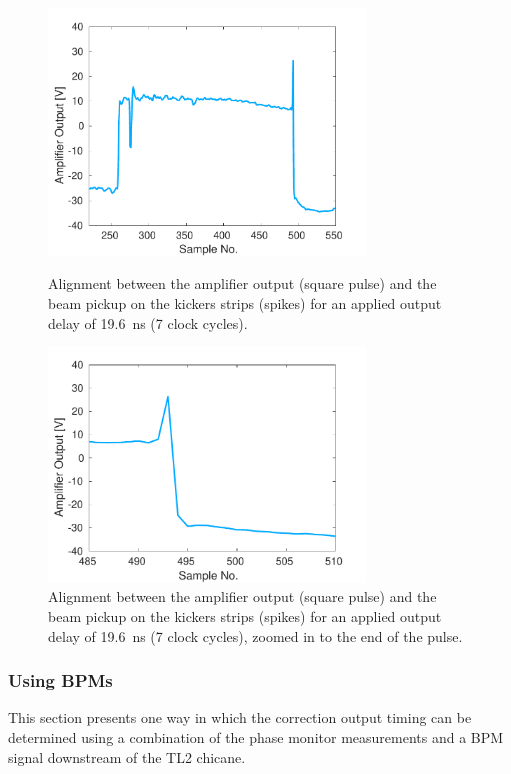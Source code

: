 \begin{figure}
  \centering
  \includegraphics[width=0.75\textwidth]{Figures/commissioning/absDelay7_all}
  \caption{Alignment between the amplifier output (square pulse) and the beam pickup on the kickers strips (spikes) for an applied output delay of 19.6~ns (7 clock cycles).}
  \label{f:absDelay7_all}
  \includegraphics[width=0.75\textwidth]{Figures/commissioning/absDelay7_end}
  \caption{Alignment between the amplifier output (square pulse) and the beam pickup on the kickers strips (spikes) for an applied output delay of 19.6~ns (7 clock cycles), zoomed in to the end of the pulse.}
  \label{f:absDelay7_end}
\end{figure}


\subsubsection{Using BPMs}
\label{sss:relativeBPM}

This section presents one way in which the correction output timing can be determined using a combination of the phase monitor measurements and a BPM signal downstream of the TL2 chicane. 

